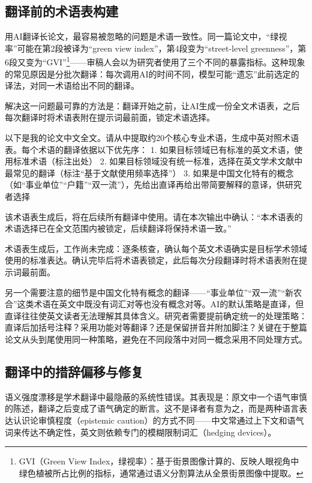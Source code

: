 \subsection{翻译前的术语表构建}

用AI翻译长论文，最容易被忽略的问题是术语一致性。同一篇论文中，``绿视率''可能在第2段被译为``green view index''，第4段变为``street-level greenness''，第6段又变为``GVI''\footnote{GVI（Green View Index，绿视率）：基于街景图像计算的、反映人眼视角中绿色植被所占比例的指标，通常通过语义分割算法从全景街景图像中提取。}——审稿人会以为研究者使用了三个不同的暴露指标。这种现象的常见原因是分批次翻译：每次调用AI的时间不同，模型可能``遗忘''此前选定的译法，对同一术语给出不同的翻译。

解决这一问题最可靠的方法是：翻译开始之前，让AI生成一份全文术语表，之后每次翻译时将术语表附在提示词最前面，锁定术语选择。

\begin{userbox}
以下是我的论文中文全文。请从中提取约20个核心专业术语，生成中英对照术语表。每个术语的翻译依据以下优先序：
1. 如果目标领域已有标准的英文术语，使用标准术语（标注出处）
2. 如果目标领域没有统一标准，选择在英文学术文献中最常见的翻译（标注``基于文献使用频率选择''）
3. 如果是中国文化特有的概念（如``事业单位''``户籍''``双一流''），先给出直译再给出带简要解释的意译，供研究者选择

该术语表生成后，将在后续所有翻译中使用。请在本次输出中确认：``本术语表的术语选择已在全文范围内被锁定，后续翻译将保持术语一致。''
\end{userbox}

术语表生成后，工作尚未完成：逐条核查，确认每个英文术语确实是目标学术领域使用的标准表达。确认完毕后将术语表锁定，此后每次分段翻译时将术语表附在提示词最前面。

另一个需要注意的细节是中国文化特有概念的翻译——``事业单位''``双一流''``新农合''这类术语在英文中既没有词汇对等也没有概念对等。AI的默认策略是直译，但直译往往使英文读者无法理解其具体含义。研究者需要提前确定统一的处理策略：直译后加括号注释？采用功能对等翻译？还是保留拼音并附加脚注？关键在于整篇论文从头到尾使用同一种策略，避免在不同段落中对同一概念采用不同处理方式。


\subsection{翻译中的措辞偏移与修复}

语义强度漂移是学术翻译中最隐蔽的系统性错误。其表现是：原文中一个语气审慎的陈述，翻译之后变成了语气确定的断言。这不是译者有意为之，而是两种语言表达认识论审慎程度（epistemic caution）的方式不同——中文常通过上下文和语气词来传达不确定性，英文则依赖专门的模糊限制词汇（hedging devices）。

